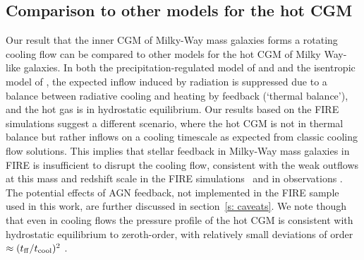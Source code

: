 \documentclass[fleqn,usenatbib]{mnras}
\begin{document}


\subsection{Comparison to other models for the hot CGM}

Our result that the inner CGM of Milky-Way mass galaxies forms a rotating cooling flow can be compared to other models for the hot CGM of Milky Way-like galaxies.
In both the precipitation-regulated model of \cite{Sharma2012} and \cite{Voit2017} and the isentropic model of \cite{Faerman2020}, the expected inflow induced by radiation is suppressed due to a balance between radiative cooling and heating by feedback (`thermal balance'), and the hot gas is in hydrostatic equilibrium.
Our results based on the FIRE simulations suggest a different scenario, where the hot CGM is not in thermal balance but rather inflows on a cooling timescale as expected from classic cooling flow solutions.
This implies that stellar feedback in Milky-Way mass galaxies in FIRE is insufficient to disrupt the cooling flow, consistent with the weak outflows at this mass and redshift scale in the FIRE simulations~\citep{Muratov2015, Muratov2017, Angles-Alcazar2017, Pandya2021} and in observations \citep[e.g.,][]{Heckman2019}.
The potential effects of AGN feedback, not implemented in the FIRE sample used in this work, are further discussed in section~\ref{s: caveats}.
We note though that even in cooling flows the pressure profile of the hot CGM is consistent with hydrostatic equilibrium to zeroth-order, with relatively small deviations of order $\approx(t_{\rm ff}/t_{\rm cool})^2$ \citep{Stern2019}. 
\end{document}
